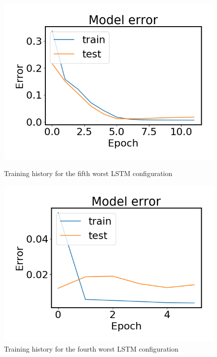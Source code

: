     \begin{figure}
        \begin{minipage}[b]{0.49\linewidth}
            \centering
            \includegraphics[width = \textwidth]{report/figures/analysis/lstm_gridsearch/worst_lstm_error_-5.png}
            \caption{Training history for the fifth worst LSTM configuration}
            \label{fig:lstm_grid_error_best_appendix}
        \end{minipage}
        \hfill\vline\hfill
        \begin{minipage}[b]{0.49\linewidth}
            \centering
            \includegraphics[width = \textwidth]{report/figures/analysis/lstm_gridsearch/worst_lstm_error_-4.png}
            \caption{Training history for the fourth worst LSTM configuration}
            \label{fig:lstm_grid_error_worst_appendix}
        \end{minipage}
    \end{figure}

